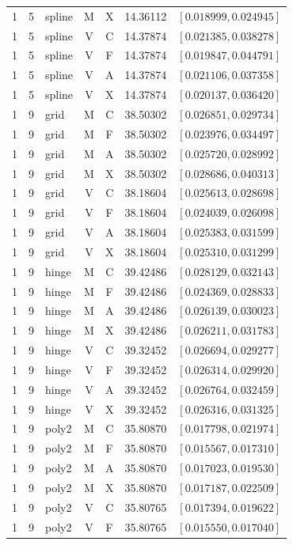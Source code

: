 \begin{longtable}{r r l c c r l}
1 & 5 & spline & M & X & 14.36112 & $[0.018999,0.024945]$ \\
1 & 5 & spline & V & C & 14.37874 & $[0.021385,0.038278]$ \\
1 & 5 & spline & V & F & 14.37874 & $[0.019847,0.044791]$ \\
1 & 5 & spline & V & A & 14.37874 & $[0.021106,0.037358]$ \\
1 & 5 & spline & V & X & 14.37874 & $[0.020137,0.036420]$ \\
1 & 9 & grid & M & C & 38.50302 & $[0.026851,0.029734]$ \\
1 & 9 & grid & M & F & 38.50302 & $[0.023976,0.034497]$ \\
1 & 9 & grid & M & A & 38.50302 & $[0.025720,0.028992]$ \\
1 & 9 & grid & M & X & 38.50302 & $[0.028686,0.040313]$ \\
1 & 9 & grid & V & C & 38.18604 & $[0.025613,0.028698]$ \\
1 & 9 & grid & V & F & 38.18604 & $[0.024039,0.026098]$ \\
1 & 9 & grid & V & A & 38.18604 & $[0.025383,0.031599]$ \\
1 & 9 & grid & V & X & 38.18604 & $[0.025310,0.031299]$ \\
1 & 9 & hinge & M & C & 39.42486 & $[0.028129,0.032143]$ \\
1 & 9 & hinge & M & F & 39.42486 & $[0.024369,0.028833]$ \\
1 & 9 & hinge & M & A & 39.42486 & $[0.026139,0.030023]$ \\
1 & 9 & hinge & M & X & 39.42486 & $[0.026211,0.031783]$ \\
1 & 9 & hinge & V & C & 39.32452 & $[0.026694,0.029277]$ \\
1 & 9 & hinge & V & F & 39.32452 & $[0.026314,0.029920]$ \\
1 & 9 & hinge & V & A & 39.32452 & $[0.026764,0.032459]$ \\
1 & 9 & hinge & V & X & 39.32452 & $[0.026316,0.031325]$ \\
1 & 9 & poly2 & M & C & 35.80870 & $[0.017798,0.021974]$ \\
1 & 9 & poly2 & M & F & 35.80870 & $[0.015567,0.017310]$ \\
1 & 9 & poly2 & M & A & 35.80870 & $[0.017023,0.019530]$ \\
1 & 9 & poly2 & M & X & 35.80870 & $[0.017187,0.022509]$ \\
1 & 9 & poly2 & V & C & 35.80765 & $[0.017394,0.019622]$ \\
1 & 9 & poly2 & V & F & 35.80765 & $[0.015550,0.017040]$ \\

\end{longtable}
